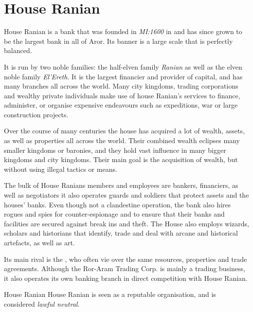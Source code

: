 \section{House Ranian}
\label{sec:House Ranian}

House Ranian is a bank that was founded in \emph{MI:1600} in
 and has since grown to be the largest bank in all of
Aror. Its banner is a large scale that is perfectly balanced.

It is run by two noble families: the half-elven family \emph{Ranian} as well
as the elven noble family \emph{El'Ereth}. It is the largest financier and
provider of capital, and has many branches all across the world. Many city
kingdoms, trading corporations and wealthy private individuals make use of
house Ranian's services to finance, administer, or organise expensive
endeavours such as expeditions, war or large construction projects.

Over the course of many centuries the house has acquired a lot of wealth,
assets, as well as properties all across the world. Their combined wealth
eclipses many smaller kingdoms or baronies, and they hold vast influence in
many bigger kingdoms and city kingdoms. Their main goal is the acquisition of
wealth, but without using illegal tactics or means.

The bulk of House Ranians members and employees are bankers, financiers,
as well as negotiators it also operates guards and soldiers that protect
assets and the houses' banks. Even though not a clandestine operation,
the bank also hires rogues and spies for counter-espionage and to ensure
that their banks and facilities are secured against break ins and theft.
The House also employs wizards, scholars and historians that identify,
trade and deal with arcane and historical artefacts, as well as art.

Its main rival is the , who often
vie over the same resources, properties and trade agreements. Although the
Ror-Aram Trading Corp. is mainly a trading business, it also operates its
own banking branch in direct competition with House Ranian.

\begin{35e}{House Ranian}
  House Ranian is seen as a reputable organisation, and is considered
  \emph{lawful neutral}.
\end{35e}
